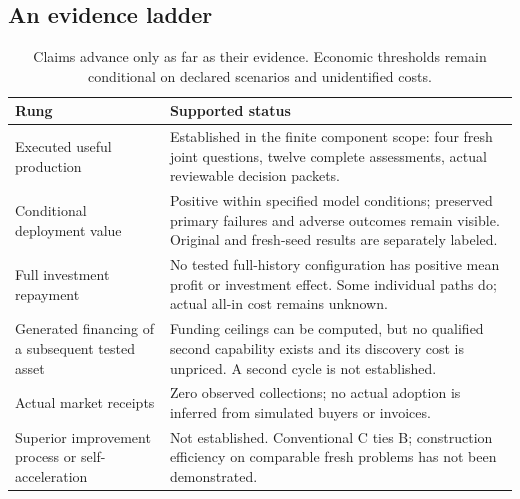 \subsection{An evidence ladder}
\begin{table}[H]
\centering\small
\caption{Claims advance only as far as their evidence. Economic thresholds remain conditional
on declared scenarios and unidentified costs.}
\begin{tabularx}{\textwidth}{p{43mm}Y}
\toprule
Rung & Supported status\\
\midrule
Executed useful production & Established in the finite component scope: four fresh joint
questions, twelve complete assessments, actual reviewable decision packets.\\
Conditional deployment value & Positive within specified model conditions; preserved primary
failures and adverse outcomes remain visible. Original and fresh-seed results are separately labeled.\\
Full investment repayment & No tested full-history configuration has positive mean profit
or investment effect. Some individual paths do; actual all-in cost remains unknown.\\
Generated financing of a subsequent tested asset & Funding ceilings can be computed, but
no qualified second capability exists and its discovery cost is unpriced. A second cycle is not established.\\
Actual market receipts & Zero observed collections; no actual adoption is inferred from
simulated buyers or invoices.\\
Superior improvement process or self-acceleration & Not established. Conventional C ties B;
construction efficiency on comparable fresh problems has not been demonstrated.\\
\bottomrule
\end{tabularx}
\end{table}
